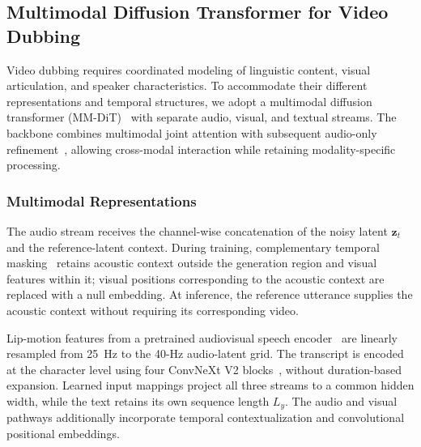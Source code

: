 
\subsection{Multimodal Diffusion Transformer for Video Dubbing}
\label{subsec:mmdit_backbone}
\label{sec:mmdit_dubbing}

Video dubbing requires coordinated modeling of linguistic content, visual
articulation, and speaker characteristics. To accommodate their different
representations and temporal structures, we adopt a multimodal diffusion
transformer (MM-DiT)~\cite{esser2024scaling} with separate audio, visual,
and textual streams. The backbone combines multimodal joint attention with
subsequent audio-only refinement~\cite{cheng2025mmaudio,yun2026immersivetts},
allowing cross-modal interaction while retaining modality-specific processing.

\subsubsection{Multimodal Representations}
\label{subsubsec:mmdit_inputs}
The audio stream receives the channel-wise concatenation of the noisy latent
$\mathbf{z}_t$ and the reference-latent context. During training,
complementary temporal masking~\cite{choi2025aligndit} retains acoustic
context outside the generation region and visual features within it; visual
positions corresponding to the acoustic context are replaced with a null
embedding. At inference, the reference utterance supplies the acoustic
context without requiring its corresponding video.

Lip-motion features from a pretrained audiovisual speech
encoder~\cite{shi2022avhubert} are linearly resampled from 25~Hz to the
40-Hz audio-latent grid. The transcript is encoded at the character level
using four ConvNeXt V2 blocks~\cite{woo2023convnext,chen2025f5tts},
without duration-based expansion. Learned input mappings project all three
streams to a common hidden width, while the text retains its own sequence
length $L_y$. The audio and visual pathways additionally incorporate temporal
contextualization and convolutional positional embeddings.

